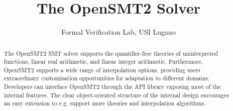 \documentclass{article}
\title{The OpenSMT2 Solver}
\author{Formal Verification Lab, USI Lugano}
\begin{document}
\maketitle

\begin{abstract}
The OpenSMT2 SMT solver supports the quantifier-free theories of uninterpreted functions, linear real arithmetic, and linear integer arithmetic.
Furthermore, OpenSMT2 supports a wide range of interpolation options, providing users extraordinary customisation opportunities for adaptation to different domains.
Developers can interface OpenSMT2 through the API library exposing most of the internal features. The clear object-oriented structure of the internal design encourages an easy extension to e.g. support more theories and interpolation algorithms.
\end{abstract}
\end{document}
